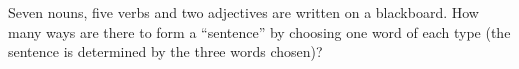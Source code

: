 Seven nouns, five verbs and two adjectives are written on a blackboard. How many ways are there to form a ``sentence'' by choosing one word of each type (the sentence is determined by the three words chosen)?
